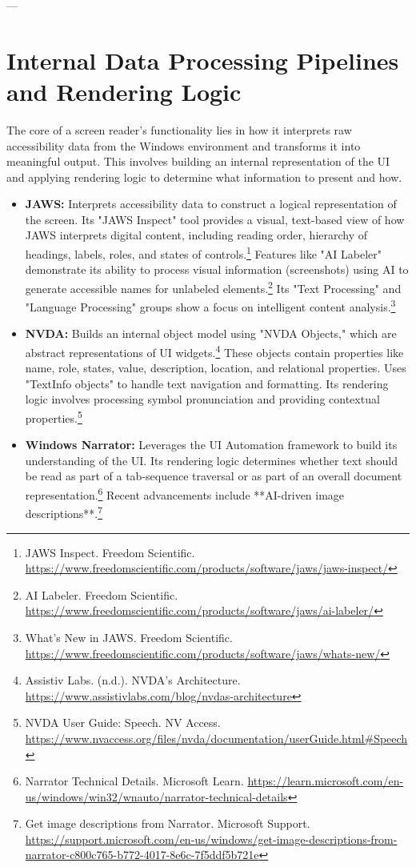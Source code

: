---

\section{Internal Data Processing Pipelines and Rendering Logic}
\label{sec:data-pipelines}

The core of a screen reader's functionality lies in how it interprets raw accessibility data from the Windows environment and transforms it into meaningful output. This involves building an internal representation of the UI and applying rendering logic to determine what information to present and how.

\begin{itemize}[leftmargin=*,noitemsep,topsep=0pt]
    \item \textbf{JAWS:} Interprets accessibility data to construct a logical representation of the screen. Its "JAWS Inspect" tool provides a visual, text-based view of how JAWS interprets digital content, including reading order, hierarchy of headings, labels, roles, and states of controls.\footnote{JAWS Inspect. Freedom Scientific. \url{https://www.freedomscientific.com/products/software/jaws/jaws-inspect/}} Features like "AI Labeler" demonstrate its ability to process visual information (screenshots) using AI to generate accessible names for unlabeled elements.\footnote{AI Labeler. Freedom Scientific. \url{https://www.freedomscientific.com/products/software/jaws/ai-labeler/}} Its "Text Processing" and "Language Processing" groups show a focus on intelligent content analysis.\footnote{What's New in JAWS. Freedom Scientific. \url{https://www.freedomscientific.com/products/software/jaws/whats-new/}}
    \item \textbf{NVDA:} Builds an internal object model using "NVDA Objects," which are abstract representations of UI widgets.\footnote{Assistiv Labs. (n.d.). NVDA's Architecture. \url{https://www.assistivlabs.com/blog/nvdas-architecture}} These objects contain properties like name, role, states, value, description, location, and relational properties. Uses "TextInfo objects" to handle text navigation and formatting. Its rendering logic involves processing symbol pronunciation and providing contextual properties.\footnote{NVDA User Guide: Speech. NV Access. \url{https://www.nvaccess.org/files/nvda/documentation/userGuide.html#Speech}}
    \item \textbf{Windows Narrator:} Leverages the UI Automation framework to build its understanding of the UI. Its rendering logic determines whether text should be read as part of a tab-sequence traversal or as part of an overall document representation.\footnote{Narrator Technical Details. Microsoft Learn. \url{https://learn.microsoft.com/en-us/windows/win32/wnauto/narrator-technical-details}} Recent advancements include **AI-driven image descriptions**.\footnote{Get image descriptions from Narrator. Microsoft Support. \url{https://support.microsoft.com/en-us/windows/get-image-descriptions-from-narrator-c800c765-b772-4017-8e6c-7f5ddf5b721e}}

\end{itemize}

